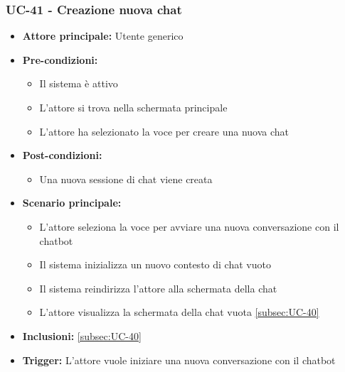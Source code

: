 \documentclass[a4paper,12pt]{article}
\begin{document}
\subsubsection{UC-41 - Creazione nuova chat} \label{subsec:UC-41}
\begin{itemize}
    \item \textbf{Attore principale:} Utente generico
    \item \textbf{Pre-condizioni:}
    \begin{itemize}
        \item Il sistema è attivo
        \item L'attore si trova nella schermata principale
        \item L'attore ha selezionato la voce per creare una nuova chat
    \end{itemize}
    \item \textbf{Post-condizioni:} 
    \begin{itemize}
        \item Una nuova sessione di chat viene creata
    \end{itemize}
    \item \textbf{Scenario principale:} 
    \begin{itemize}
        \item L'attore seleziona la voce per avviare una nuova conversazione con il chatbot
        \item Il sistema inizializza un nuovo contesto di chat vuoto
        \item Il sistema reindirizza l'attore alla schermata della chat
        \item L'attore visualizza la schermata della chat vuota \ref{subsec:UC-40}
    \end{itemize}
    \item \textbf{Inclusioni:} \ref{subsec:UC-40}
    \item \textbf{Trigger:} L'attore vuole iniziare una nuova conversazione con il chatbot
\end{itemize}
\end{document}
